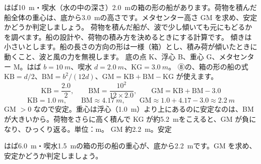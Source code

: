 \begin{phreidai}[箱の形の船のメタセンター高さ]
\label{ph:力-12:ex14}はば\qty{10}{m}・喫水（水の中の深さ）\qty{2.0}{m}の箱の形の船があります。荷物を積んだ船全体の重心は、底から\qty{3.0}{m}の高さです。メタセンター高さ GM を求め、安定かどうか判定しましょう。
\phbamen
荷物を積んだ船が、波で少し傾いても元にもどるかを調べます。船の設計や、荷物の積み方を決めるときにする計算です。
\phmushi
傾きは小さいとします。船の長さの方向の形は一様（箱）とし、積み荷が傾いたときに動くこと、波と風の力を無視します。
\phzu
底の点 K、浮心 B、重心 G、メタセンター M。はば $b=\qty{10}{m}$、喫水 $d=\qty{2.0}{m}$、$\mathrm{KG}=\qty{3.0}{m}$。
\phriyu
⑧の、箱の形の船の式 $\mathrm{KB}=d/2$、$\mathrm{BM}=b^2/(12d)$、$\mathrm{GM}=\mathrm{KB}+\mathrm{BM}-\mathrm{KG}$ が使えます。
\phtateru
\[ \mathrm{KB}=\frac{2.0}{2},\qquad \mathrm{BM}=\frac{10^2}{12\times2.0},\qquad \mathrm{GM}=\mathrm{KB}+\mathrm{BM}-3.0 \]
\phtoku
\[ \mathrm{KB}=\qty{1.0}{m},\qquad \mathrm{BM}\approx\qty{4.17}{m},\qquad \mathrm{GM}\approx1.0+4.17-3.0\approx\qty{2.2}{m} \]
\phtashikame
GM $>0$ なので安定。重心は浮心（\qty{1.0}{m}）より上にあるのに安定なのは、BM が大きいから。荷物をさらに高く積んで KG が約\qty{5.2}{m}をこえると、GM が負になり、ひっくり返る。単位：m。
\kotae GM 約\qty{2.2}{m}。安定
\end{phreidai}
\begin{jibun}
はば\qty{6.0}{m}・喫水\qty{1.5}{m}の箱の形の船の重心が、底から\qty{2.2}{m}です。GM を求め、安定かどうか判定しましょう。
\end{jibun}

